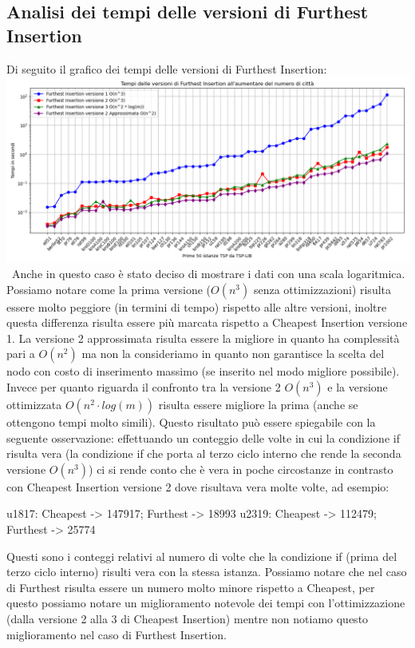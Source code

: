 \documentclass[a4paper,12pt]{report}
\begin{document}
\subsection{Analisi dei tempi delle versioni di Furthest Insertion}
Di seguito il grafico dei tempi delle versioni di Furthest Insertion: \newline
\includegraphics[width=1\textwidth]{../Grafici/5.png} \
Anche in questo caso è stato deciso di mostrare i dati con una scala logaritmica. Possiamo notare come la prima versione ($O(n^3)$ senza ottimizzazioni) risulta essere molto peggiore (in termini di tempo) rispetto alle altre versioni, inoltre questa differenza risulta essere più marcata rispetto a Cheapest Insertion versione 1. La versione 2 approssimata risulta essere la migliore in quanto ha complessità pari a $O(n^2)$ ma non la consideriamo in quanto non garantisce la scelta del nodo con costo di inserimento massimo (se inserito nel modo migliore possibile). Invece per quanto riguarda il confronto tra la versione 2 $O(n^3)$ e la versione ottimizzata $O(n^2 \cdot log(m))$ risulta essere migliore la prima (anche se ottengono tempi molto simili). Questo risultato può essere spiegabile con la seguente osservazione: effettuando un conteggio delle volte in cui la condizione if risulta vera (la condizione if che porta al terzo ciclo interno che rende la seconda versione $O(n^3)$) ci si rende conto che è vera in poche circostanze in contrasto con Cheapest Insertion versione 2 dove risultava vera molte volte, ad esempio:
\begin{myverbatim}
u1817: Cheapest -> 147917; Furthest -> 18993
u2319: Cheapest -> 112479; Furthest -> 25774
\end{myverbatim}
Questi sono i conteggi relativi al numero di volte che la condizione if (prima del terzo ciclo interno) risulti vera con la stessa istanza. Possiamo notare che nel caso di Furthest risulta essere un numero molto minore rispetto a Cheapest, per questo possiamo notare un miglioramento notevole dei tempi con l'ottimizzazione (dalla versione 2 alla 3 di Cheapest Insertion) mentre non notiamo questo miglioramento nel caso di Furthest Insertion.
\end{document}
